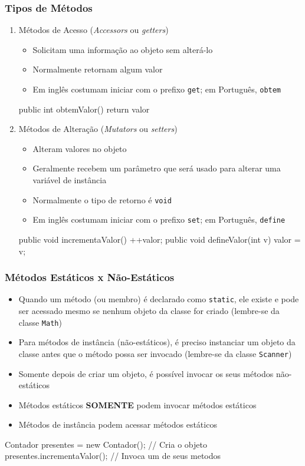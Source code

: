 \documentclass[xcolor={dvipsnames,table},aspectratio=169]{beamer}
\begin{document}
\begin{frame}[fragile]\frametitle{Tipos de Métodos}
\begin{enumerate}
	\item Métodos de Acesso (\emph{Accessors} ou \emph{getters})
	\begin{itemize}
		\item Solicitam uma informação ao objeto sem alterá-lo
		\item Normalmente retornam algum valor
		\item Em inglês costumam iniciar com o prefixo \texttt{get}; em Português, \texttt{obtem}
	\end{itemize}
\begin{javacode}
public int obtemValor() { return valor }
\end{javacode}
	\item Métodos de Alteração (\emph{Mutators} ou \emph{setters})
	\begin{itemize}
		\item Alteram valores no objeto
		\item Geralmente recebem um parâmetro que será usado para alterar uma variável de instância
		\item Normalmente o tipo de retorno é \texttt{void}
		\item Em inglês costumam iniciar com o prefixo \texttt{set}; em Português, \texttt{define	}
	\end{itemize}
\begin{javacode}
public void incrementaValor() { ++valor; }
public void defineValor(int v) { valor = v; }
\end{javacode}
\end{enumerate}
\end{frame}

\begin{frame}[fragile]\frametitle{Métodos Estáticos x Não-Estáticos}
\begin{itemize}
	\item Quando um método (ou membro) é declarado como \texttt{static}, ele existe e pode ser acessado mesmo se nenhum objeto da classe for criado (lembre-se da classe \texttt{Math})
	\item Para métodos de instância (não-estáticos), é preciso instanciar um objeto da classe antes que o método possa ser invocado (lembre-se da classe \texttt{Scanner})
	\item Somente depois de criar um objeto, é possível invocar os seus métodos não-estáticos
	\item Métodos estáticos \textbf{SOMENTE} podem invocar métodos estáticos
	\item Métodos de instância podem acessar métodos estáticos
\end{itemize}
\begin{javacode}
Contador presentes = new Contador(); // Cria o objeto
presentes.incrementaValor(); // Invoca um de seus metodos
\end{javacode}
\end{frame}
\end{document}
